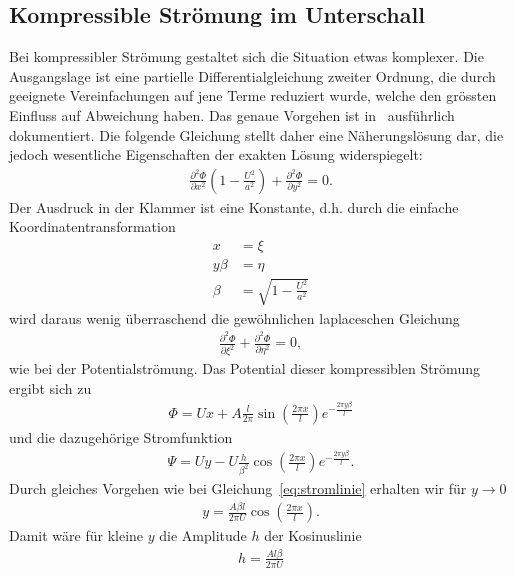 \subsection{Kompressible Strömung im Unterschall}
Bei kompressibler Strömung gestaltet sich die Situation etwas komplexer.
Die Ausgangslage ist eine partielle Differentialgleichung zweiter Ordnung,
die durch geeignete Vereinfachungen auf jene Terme reduziert wurde, 
welche den grössten Einfluss auf Abweichung haben.
Das genaue Vorgehen ist in~\cite{Ackeret1928} ausführlich dokumentiert.
Die folgende Gleichung stellt daher eine Näherungslösung dar,
die jedoch wesentliche Eigenschaften der exakten Lösung widerspiegelt:
\begin{align}
    \frac{\partial^2 \Phi}{\partial x^2} 
    \left(1-\frac{U^2}{a^2}\right)
    +
    \frac{\partial^2 \Phi}{\partial y^2}
    =
    0.\label{eq:kompressible_stroemung}
\end{align}
Der Ausdruck in der Klammer ist eine Konstante, d.h.
durch die einfache Koordinatentransformation
\begin{align*}
    x 
    &=
    \xi \\
    y \beta
    &=
    \eta \\
    \beta
    &=
    \sqrt{1-\frac{U^2}{a^2}}
\end{align*}
wird daraus wenig überraschend die gewöhnlichen laplaceschen Gleichung
\begin{align*}
    \frac{\partial^2 \Phi}{\partial \xi^2} 
    +
    \frac{\partial^2 \Phi}{\partial \eta^2}
    =
    0,
\end{align*}
wie bei der Potentialströmung.
Das Potential dieser kompressiblen Strömung ergibt sich zu
\begin{align*}
    \Phi
    =
    U x + A \frac{l}{2 \pi} \sin\left(\frac{2 \pi x}{l}\right)
     e^{-\frac{2 \pi y \beta}{l}}
\end{align*}
und die dazugehörige Stromfunktion
\begin{align*}
    \Psi
    =
    U y - U \frac{h}{\beta^2} \cos\left(\frac{2\pi x}{l}\right)
     e^{-\frac{2\pi y \beta}{l}}.
\end{align*}
Durch gleiches Vorgehen wie bei Gleichung~\eqref{eq:stromlinie}
erhalten wir für $y \to 0$
\begin{align*}
    y
    =
    \frac{A \beta l}{2 \pi U} 
    \cos\left(\frac{2 \pi x}{l}\right).
\end{align*}
Damit wäre für kleine $y$ die Amplitude $h$ der Kosinuslinie
\begin{align*}
    h
    =
    \frac{A l \beta}{2 \pi U}
\end{align*}
